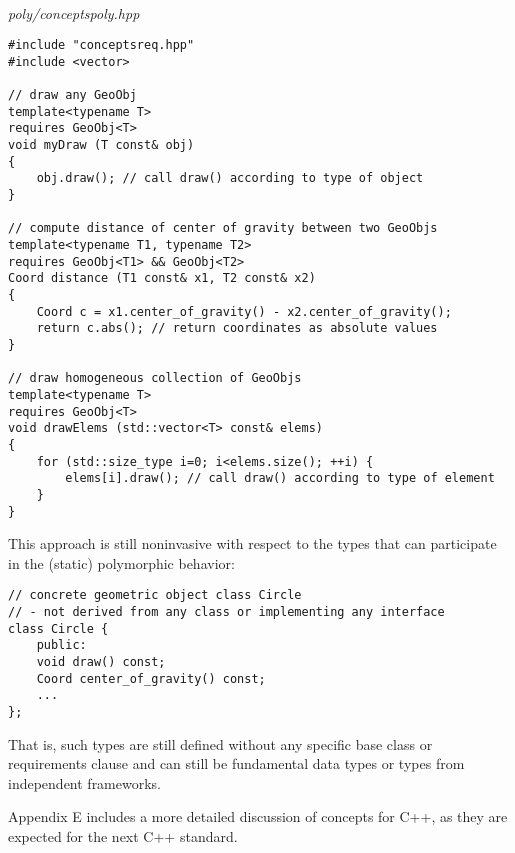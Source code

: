 \hspace*{\fill} \\ %
\noindent
\textit{poly/conceptspoly.hpp}
\begin{lstlisting}[style=styleCXX]
#include "conceptsreq.hpp"
#include <vector>

// draw any GeoObj
template<typename T>
requires GeoObj<T>
void myDraw (T const& obj)
{
	obj.draw(); // call draw() according to type of object
}

// compute distance of center of gravity between two GeoObjs
template<typename T1, typename T2>
requires GeoObj<T1> && GeoObj<T2>
Coord distance (T1 const& x1, T2 const& x2)
{
	Coord c = x1.center_of_gravity() - x2.center_of_gravity();
	return c.abs(); // return coordinates as absolute values
}

// draw homogeneous collection of GeoObjs
template<typename T>
requires GeoObj<T>
void drawElems (std::vector<T> const& elems)
{
	for (std::size_type i=0; i<elems.size(); ++i) {
		elems[i].draw(); // call draw() according to type of element
	}
}
\end{lstlisting}

This approach is still noninvasive with respect to the types that can participate in the (static) polymorphic behavior:

\begin{lstlisting}[style=styleCXX]
// concrete geometric object class Circle
// - not derived from any class or implementing any interface
class Circle {
	public:
	void draw() const;
	Coord center_of_gravity() const;
	...
};
\end{lstlisting}

That is, such types are still defined without any specific base class or requirements clause and can still be fundamental data types or types from independent frameworks.

Appendix E includes a more detailed discussion of concepts for C++, as they are expected for the next C++ standard.



















